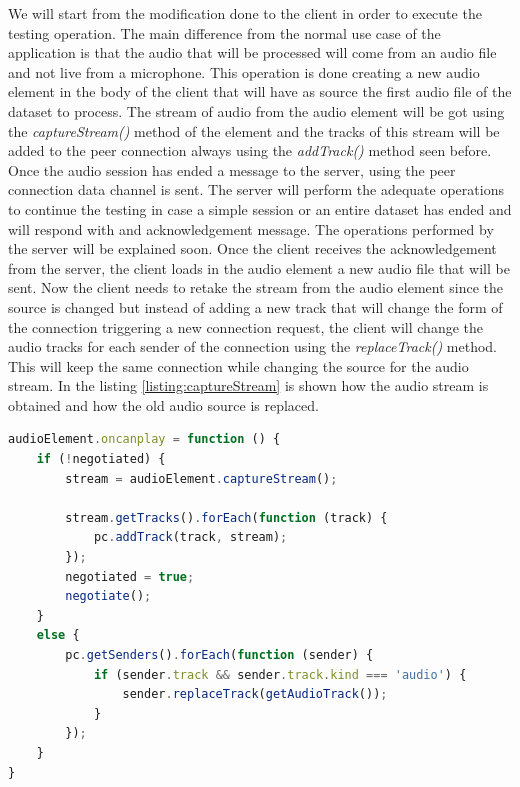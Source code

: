 \documentclass[../main.tex]{subfiles}
\begin{document}
We will start from the modification done to the client in order to execute the testing operation. The main difference from the normal use case of the application is that the audio that will be processed will come from an audio file and not live from a microphone. This operation is done creating a new audio element in the body of the client that will have as source the first audio file of the dataset to process. The stream of audio from the audio element will be got using the \textit{captureStream()} method of the element and the tracks of this stream will be added to the peer connection always using the \textit{addTrack()} method seen before. Once the audio session has ended a message to the server, using the peer connection data channel is sent. The server will perform the adequate operations to continue the testing in case a simple session or an entire dataset has ended and will respond with and acknowledgement message. The operations performed by the server will be explained soon. Once the client receives the acknowledgement from the server, the client loads in the audio element a new audio file that will be sent. Now the client needs to retake the stream from the audio element since the source is changed but instead of adding a new track that will change the form of the connection triggering a new connection request, the client will change the audio tracks for each sender of the connection using the \textit{replaceTrack()} method. This will keep the same connection while changing the source for the audio stream. In the listing \ref{listing:captureStream} is shown how the audio stream is obtained and how the old audio source is replaced.

\begin{lstlisting}[language=Javascript, caption={captureStream() and replaceTrack() methods}]
audioElement.oncanplay = function () {
    if (!negotiated) {
        stream = audioElement.captureStream();

        stream.getTracks().forEach(function (track) {
            pc.addTrack(track, stream);
        });
        negotiated = true;
        negotiate();
    }
    else {
        pc.getSenders().forEach(function (sender) {
            if (sender.track && sender.track.kind === 'audio') {
                sender.replaceTrack(getAudioTrack());
            }
        });
    }
}
\end{lstlisting}
\label{listing:captureStream}
\end{document}

